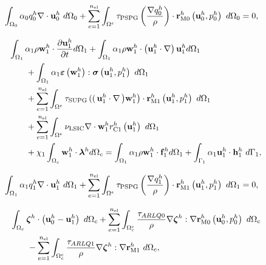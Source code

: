 \documentclass[tese_patricia]{subfiles}
\begin{document}
\begin{align}
	\begin{split}
		&	\int_{\Omega_{0}} \alpha_0 q_0^h \nabla \cdot \mathbf{u}_0^h \ d\Omega_{0} +
		\sum_{e=1}^{n_{\mathrm{el}}} \int_{\Omega^e} \tau_{\mathrm{PSPG}} \left(\frac{\nabla q_0^h}{\rho}\right) \cdot \mathbf{r}_{\mathrm{M0}}^{h}\left(\mathbf{u}_0^h,p_0^h\right) \  d\Omega_{0} = 0, 
		\label{eq:RC0est}
	\end{split}
\end{align}


\begin{align}
	\begin{split}
		&\int_{\domain_1} \arlequinWFLocal \density \wlocalh \cdot \frac{\partial\ulocalh}{\partial t} d\domain_{1} +
		\int_{\domain_1} \arlequinWFLocal \density \wlocalh \cdot  \left(\ulocalh \cdot \nabla\right)\ulocalh d\domain_{1}  \\ 
		&\qquad+	
		\int_{\domain_{1}} \arlequinWFLocal \straintensor \left(\wlocalh\right) : \stresstensor \left(\ulocalh,\plocalh\right)\ d\domain_{1} 
		\\ 
		&\qquad+ \sum_{e=1}^{\nel} \int_{\domainE} \SUPG  \left( \right(\ulocalh \cdot \nabla \left) \wlocalh\right) \cdot \resMomLocal\left(\ulocalh,\plocalh \right)\  d\domain_{1} \\ 
		&\qquad+\sum_{e=1}^{\nel} \int_{\domainE} \LSIC \nabla \cdot \wlocalh \resPreLocal
		\left(\ulocalh\right)\  d\domain_{1} \\
		&\qquad+ \chi_{1} \int_{\domain_c} \wlocalh \cdot \lagrangeMultiplier^{h} d\domain_{c}  = \int_{\domain_1} \arlequinWFLocal \density \wlocalh \cdot  \sbodyforce_{1}^{h} d\domain_{1} + \int_{\boundary_{1}} \arlequinWFLocal \ulocalh \cdot \straction_{1}^{h}\ d\boundary_{1}, 
		\label{eq:FinalSystem1est}
	\end{split}
\end{align}


\begin{align}
	\begin{split}
		&	\int_{\Omega_{1}} \alpha_1 q_1^h \nabla \cdot \mathbf{u}_1^h \ d\Omega_{1}+
		\sum_{e=1}^{n_{\mathrm{el}}} \int_{\Omega^e} \tau_{\mathrm{PSPG}} \left(\frac{\nabla q_1^h}{\rho}\right) \cdot \mathbf{r}_{\mathrm{M1}}^{h} \left(\mathbf{u}_1^h,p_1^h\right) \  d\Omega_{1} = 0, 
		\label{eq:RC1est}
	\end{split}
\end{align}


\begin{align}
	\begin{split}
	&\int_{\Omega_{c}}  \boldsymbol{\zeta}^h  \cdot \left(\mathbf{u}_0^h - \mathbf{u}_1^h \right) \ d\Omega_{c} + \sum_{e=1}^{n_{\mathrm{el}}} \int_{\Omega^e_{c}} \frac{\tau_{ARLQ0}}{\rho} \nabla \boldsymbol{\zeta}^h : \nabla \mathbf{r}_{\mathrm{M0}}^{h}\left(\mathbf{u}_0^h,p_0^h\right) \ d\Omega_{c}  \\
	&\qquad-\sum_{e=1}^{n_{\mathrm{el}}} \int_{\Omega^e_{c}} \frac{\tau_{ARLQ1}}{\rho} \nabla \boldsymbol{\zeta}^h : \nabla \mathbf{r}_{\mathrm{M1}}^{h} \ d\Omega_{c},
	\label{eq:EqAcoplaest}
\end{split}
\end{align}
\end{document}

